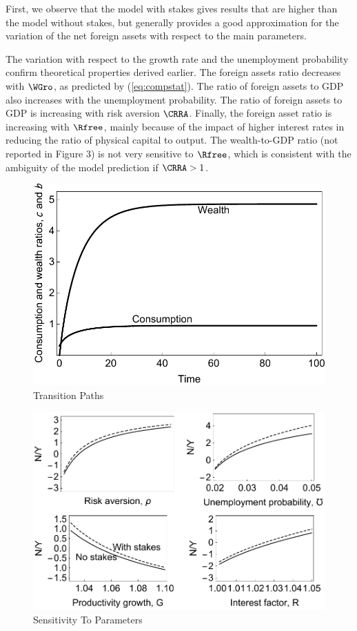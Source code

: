 \documentclass[titlepage]{\econtex}\newcommand{\texname}{cjSOE}
\begin{document}
First, we observe that the model with stakes gives results that are higher than the model without stakes, but generally provides a good approximation for the variation of the net foreign assets with respect to the main parameters.

The variation with respect to the growth rate and the unemployment probability confirm theoretical properties derived earlier. The foreign assets ratio decreases with $\WGro$, as predicted by (\ref{eq:compstat}). The ratio of foreign assets to GDP also increases with the unemployment probability.
The ratio of foreign assets to GDP is increasing with risk aversion $\CRRA$.
Finally, the foreign asset ratio is increasing with $\Rfree$, mainly because of the impact of higher interest rates in reducing the ratio of physical capital to output. The wealth-to-GDP ratio (not reported in Figure 3) is not very sensitive to $\Rfree$, which is consistent with the ambiguity of the model prediction if $\CRRA >1$.

\medskip

\begin{figure}
\includegraphics{./Figures/paths}
\caption{Transition Paths}\label{fig:paths}
\end{figure}

\medskip
\begin{figure}
\includegraphics{./Figures/sensitivity}
\caption{Sensitivity To Parameters}\label{fig:sensitivity}
\end{figure}
\end{document}
